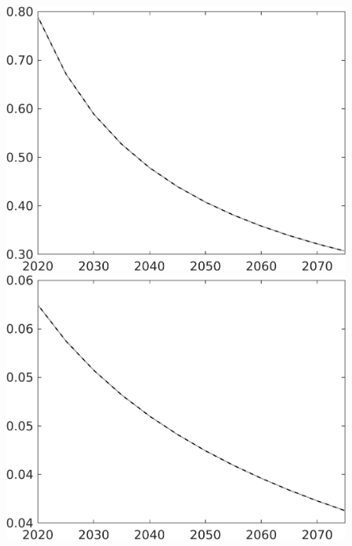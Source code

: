 \documentclass[12pt]{article}
\begin{document}
\begin{figure}[h!!]
\begin{minipage}[]{0.32\textwidth}
	\end{minipage}	
	\begin{minipage}[]{0.32\textwidth}
		\includegraphics[width=1\textwidth]{../../codding_model/own_basedOnFried/optimalPol_010922_revision/figures/all_13Sept22/CompTaul_Equlab_LFBAU_Reg0_pg_spillover0_nsk1_xgr1_knspil0_sep1_countec0_GovRev0_etaa0.79_lgd0.png}
	\end{minipage}	
\begin{minipage}[]{0.32\textwidth}
\includegraphics[width=1\textwidth]{../../codding_model/own_basedOnFried/optimalPol_010922_revision/figures/all_13Sept22/CompTaul_Equlab_LFBAU_Reg0_pepn_spillover0_nsk1_xgr1_knspil0_sep1_countec0_GovRev0_etaa0.79_lgd0.png}

\end{minipage}
\end{figure}
\end{document}
